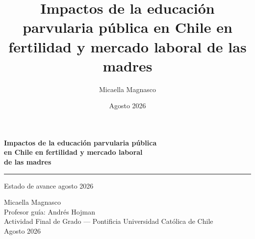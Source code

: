 \documentclass[aspectratio=169,10pt]{beamer}
\title{Impactos de la educación parvularia pública en Chile en fertilidad y mercado laboral de las madres}
\author{Micaella Magnasco}
\date{Agosto 2026}
\begin{document}
\begin{frame}[plain]
\vspace{50pt}
\begin{center}
{\LARGE\bfseries\color{navy} Impactos de la educación parvularia pública\\[3pt] en Chile en fertilidad y mercado laboral\\[3pt] de las madres}

\vspace{10pt}
\textcolor{steel}{\rule{0.5\paperwidth}{0.6pt}}

\vspace{14pt}
{\large\color{graytext} Estado de avance agosto 2026}

\vspace{55pt}
{\normalsize
Micaella Magnasco \\[4pt]
\small Profesor guía: Andrés Hojman \\[2pt]
\small Actividad Final de Grado --- Pontificia Universidad Católica de Chile \\[2pt]
\small Agosto 2026
}
\end{center}
\end{frame}
\end{document}
